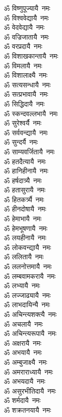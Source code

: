 \begin{flushleft}
\begin{multicols}{2}
ॐ विष्णुपूज्यायै~नमः\\
ॐ विश्ववेद्यायै~नमः\\
ॐ वेदवेद्यायै~नमः\\
ॐ वज्रिजातायै~नमः\\
ॐ वरप्रदायै~नमः\\
ॐ विशाखकान्तायै~नमः\\
ॐ विमलायै~नमः\\
ॐ विशालाक्ष्यै~नमः\\
ॐ सत्यसन्धायै~नमः\\
ॐ सत्प्रभावायै~नमः\hfill{}\\
ॐ सिद्धिदायै~नमः\\
ॐ स्कन्दवल्लभायै~नमः\\
ॐ सुरेश्वर्यै~नमः\\
ॐ सर्ववन्द्यायै~नमः\\
ॐ सुन्दर्यै~नमः\\
ॐ साम्यवर्जितायै~नमः\\
ॐ हतदैत्यायै~नमः\\
ॐ हानिहीनायै~नमः\\
ॐ हर्षदात्र्यै~नमः\\
ॐ हतासुरायै~नमः\hfill{}\\
ॐ हितकर्त्र्यै~नमः\\
ॐ हीनदोषायै~नमः\\
ॐ हेमाभायै~नमः\\
ॐ हेमभूषणायै~नमः\\
ॐ लयहीनायै~नमः\\
ॐ लोकवन्द्यायै~नमः\\
ॐ ललितायै~नमः\\
ॐ ललनोत्तमायै~नमः\\
ॐ लम्बवामकरायै~नमः\\
ॐ लभ्यायै~नमः\hfill{}\\
ॐ लज्जाढ्यायै~नमः\\
ॐ लाभदायिन्यै~नमः\\
ॐ अचिन्त्यशक्त्यै~नमः\\
ॐ अचलायै~नमः\\
ॐ अचिन्त्यरूपायै~नमः\\
ॐ अक्षरायै~नमः\\
ॐ अभयायै~नमः\\
ॐ अम्बुजाक्ष्यै~नमः\\
ॐ अमराराध्यायै~नमः\\
ॐ अभयदायै~नमः\hfill{}\\
ॐ असुरभीतिदायै~नमः\\
ॐ शर्मदायै~नमः\\
ॐ शक्रतनयायै~नमः\\

\end{multicols}
\end{flushleft}
